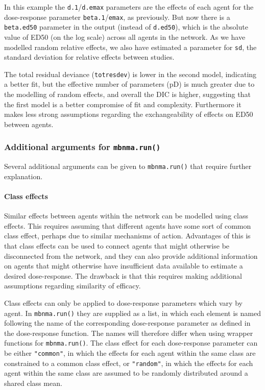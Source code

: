 \documentclass[]{article}
\let\oldparagraph\paragraph
\renewcommand{\paragraph}[1]{\oldparagraph{#1}\mbox{}}
\begin{document}
In this example the \texttt{d.1}/\texttt{d.emax} parameters are the
effects of each agent for the dose-response parameter
\texttt{beta.1}/\texttt{emax}, as previously. But now there is a
\texttt{beta.ed50} parameter in the output (instead of \texttt{d.ed50}),
which is the absolute value of ED50 (on the log scale) across all agents
in the network. As we have modelled random relative effects, we also
have estimated a parameter for \texttt{sd}, the standard deviation for
relative effects between studies.

The total residual deviance (\texttt{totresdev}) is lower in the second
model, indicating a better fit, but the effective number of parameters
(pD) is much greater due to the modelling of random effects, and overall
the DIC is higher, suggesting that the first model is a better
compromise of fit and complexity. Furthermore it makes less strong
assumptions regarding the exchangeability of effects on ED50 between
agents.

\hypertarget{additional-arguments-for-mbnma.run}{%
\subsubsection{\texorpdfstring{Additional arguments for
\texttt{mbnma.run()}}{Additional arguments for mbnma.run()}}\label{additional-arguments-for-mbnma.run}}

Several additional arguments can be given to \texttt{mbnma.run()} that
require further explanation.

\hypertarget{class-effects}{%
\paragraph{Class effects}\label{class-effects}}

Similar effects between agents within the network can be modelled using
class effects. This requires assuming that different agents have some
sort of common class effect, perhaps due to similar mechanisms of
action. Advantages of this is that class effects can be used to connect
agents that might otherwise be disconnected from the network, and they
can also provide additional information on agents that might otherwise
have insufficient data available to estimate a desired dose-response.
The drawback is that this requires making additional assumptions
regarding similarity of efficacy.

Class effects can only be applied to dose-response parameters which vary
by agent. In \texttt{mbnma.run()} they are supplied as a list, in which
each element is named following the name of the corresponding
dose-response parameter as defined in the dose-response function. The
names will therefore differ when using wrapper functions for
\texttt{mbnma.run()}. The class effect for each dose-response parameter
can be either \texttt{"common"}, in which the effects for each agent
within the same class are constrained to a common class effect, or
\texttt{"random"}, in which the effects for each agent within the same
class are assumed to be randomly distributed around a shared class mean.
\end{document}
